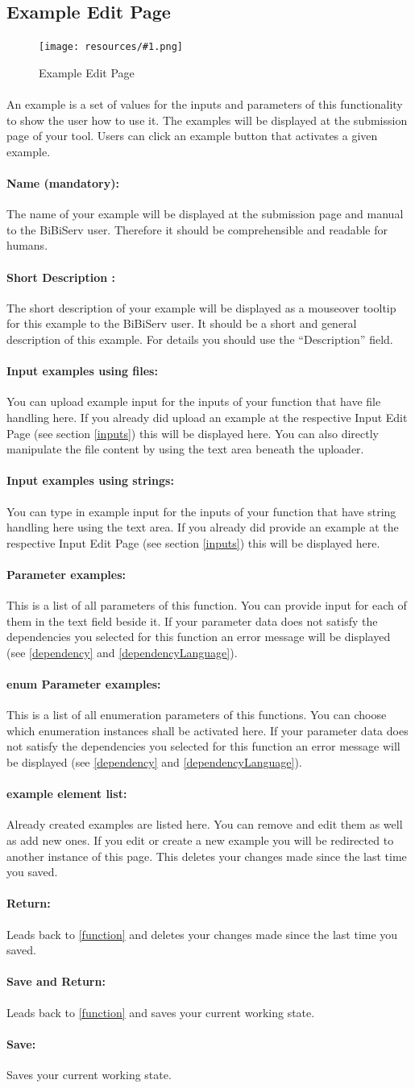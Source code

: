 \documentclass[a4paper,10pt]{book}
\newcommand{\bigpic}[1]{\texttt{[image: resources/\#1.png]}}
\newcommand{\name}[2]{\paragraph{Name #2:} The name of your #1 will be displayed at the submission page and manual to the BiBiServ user. Therefore it should be comprehensible and readable for humans.}
\newcommand{\shortDescr}[2]{\paragraph{Short Description #2:} The short description of your #1 will be displayed as a mouseover tooltip for this #1 to the BiBiServ user. It should be a short and general description of this #1. For details you should use the ``Description'' field.}
\newcommand{\buttonsDetail}[1]{
\paragraph{Return:} Leads back to #1 and deletes your changes made since the last time you saved.
\paragraph{Save and Return:} Leads back to #1 and saves your current working state.
\paragraph{Save:} Saves your current working state.
}
\newcommand{\newElem}[2]{
\paragraph{#1 element list:} Already created #1s are listed here. You can remove and edit them as well as add new ones. If you edit or create a new #1 you will be redirected to #2. This deletes your changes made since the last time you saved.
}
\begin{document}
\subsection{Example Edit Page}
\label{example}

\begin{figure}
 \bigpic{example}
 \caption{Example Edit Page}
\end{figure}

\paragraph{} An example is a set of values for the inputs and parameters of this functionality to show the user how to use it. The examples will be displayed at the submission page of your tool. Users can click an example button that activates a given example.
\name{example}{(mandatory)}
\shortDescr{example}{}
\paragraph{Input examples using files:} You can upload example input for the inputs of your function that have file handling here. If you already did upload an example at the respective Input Edit Page (see section \ref{inputs}) this will be displayed here. You can also directly manipulate the file content by using the text area beneath the uploader.
\paragraph{Input examples using strings:} You can type in example input for the inputs of your function that have string handling here using the text area. If you already did provide an example at the respective Input Edit Page (see section \ref{inputs}) this will be displayed here.
\paragraph{Parameter examples:} This is a list of all parameters of this function. You can provide input for each of them in the text field beside it. If your parameter data does not satisfy the dependencies you selected for this function an error message will be displayed (see \ref{dependency} and \ref{dependencyLanguage}).
\paragraph{enum Parameter examples:} This is a list of all enumeration parameters of this functions. You can choose which enumeration instances shall be activated here. If your parameter data does not satisfy the dependencies you selected for this function an error message will be displayed (see \ref{dependency} and \ref{dependencyLanguage}).
\newElem{example}{another instance of this page}
\buttonsDetail{\ref{function}}
\end{document}
